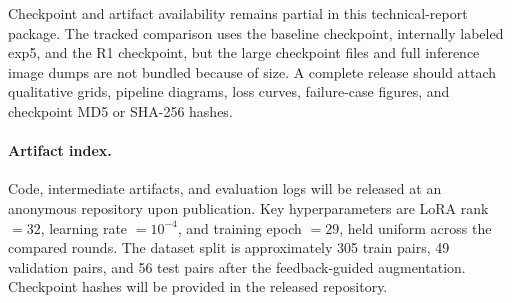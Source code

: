 \begin{table}[t]
\centering
\small
\caption{Augmentation composition for the first feedback-guided scaling round.}
\label{tab:r1-augmentation}

\end{table}

Checkpoint and artifact availability remains partial in this technical-report package. The tracked comparison uses the \semanticprobe{} baseline checkpoint, internally labeled exp5, and the \feedbackprobe{} R1 checkpoint, but the large checkpoint files and full inference image dumps are not bundled because of size. A complete release should attach qualitative grids, pipeline diagrams, loss curves, failure-case figures, and checkpoint MD5 or SHA-256 hashes.

\paragraph{Artifact index.}
Code, intermediate artifacts, and evaluation logs will be released at an anonymous repository upon publication. Key hyperparameters are LoRA rank \(=32\), learning rate \(=10^{-4}\), and training epoch \(=29\), held uniform across the compared rounds. The dataset split is approximately 305 train pairs, 49 validation pairs, and 56 test pairs after the feedback-guided augmentation. Checkpoint hashes will be provided in the released repository.
